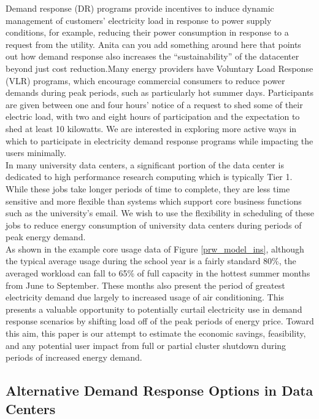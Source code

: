 Demand response (DR) programs provide incentives to induce dynamic management of customers’ electricity load in response to power supply conditions, for example, reducing their power consumption in response to a request from the utility.\cite{7039172} Anita can you add something around here that points out how demand response also increases the “sustainability” of the datacenter beyond just cost reduction.Many energy providers have Voluntary Load Response (VLR) programs, which encourage commercial consumers to reduce power demands during peak periods, such as particularly hot summer days. Participants are given between one and four hours’ notice of a request to shed some of their electric load, with two and eight hours of participation and the expectation to shed at least 10 kilowatts. We are interested in exploring more active ways in which to participate in electricity demand response programs while impacting the users minimally.   \\

In many university data centers, a significant portion of the data center is dedicated to high performance research computing which is typically Tier 1. While these jobs take longer periods of time to complete, they are less time sensitive and more flexible than systems which support core business functions such as the university's email.  We wish to use the flexibility in scheduling of these jobs to reduce energy consumption of university data centers during periods of peak energy demand. \\  

As shown in the example core usage data of Figure \ref{prw_model_ins}, although the typical average usage during the school year is a fairly standard 80\%, the averaged workload can fall to 65\% of full capacity in the hottest summer months from June to September. These months also present the period of greatest electricity demand due largely to increased usage of air conditioning. This presents a valuable opportunity to potentially curtail electricity use in demand response scenarios by shifting load off of the peak periods of energy price.  Toward this aim, this paper is our attempt to estimate the economic savings, feasibility, and any potential user impact from full or partial cluster shutdown during periods of increased energy demand.


\subsection{Alternative Demand Response Options in Data Centers}

